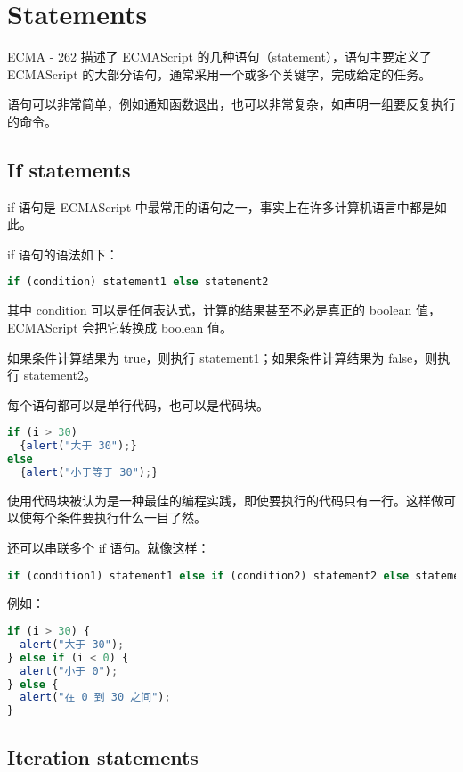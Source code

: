 \part{Statements}


ECMA - 262 描述了 ECMAScript 的几种语句（statement），语句主要定义了 ECMAScript 的大部分语句，通常采用一个或多个关键字，完成给定的任务。

语句可以非常简单，例如通知函数退出，也可以非常复杂，如声明一组要反复执行的命令。


\chapter{If statements}

if 语句是 ECMAScript 中最常用的语句之一，事实上在许多计算机语言中都是如此。

if 语句的语法如下：

\begin{lstlisting}[language=JavaScript]
if (condition) statement1 else statement2
\end{lstlisting}

其中 condition 可以是任何表达式，计算的结果甚至不必是真正的 boolean 值，ECMAScript 会把它转换成 boolean 值。

如果条件计算结果为 true，则执行 statement1；如果条件计算结果为 false，则执行 statement2。

每个语句都可以是单行代码，也可以是代码块。

\begin{lstlisting}[language=JavaScript]
if (i > 30)
  {alert("大于 30");}
else
  {alert("小于等于 30");}
\end{lstlisting}

使用代码块被认为是一种最佳的编程实践，即使要执行的代码只有一行。这样做可以使每个条件要执行什么一目了然。

还可以串联多个 if 语句。就像这样：


\begin{lstlisting}[language=JavaScript]
if (condition1) statement1 else if (condition2) statement2 else statement3
\end{lstlisting}

例如：


\begin{lstlisting}[language=JavaScript]
if (i > 30) {
  alert("大于 30");
} else if (i < 0) {
  alert("小于 0");
} else {
  alert("在 0 到 30 之间");
}
\end{lstlisting}


\chapter{Iteration statements}


